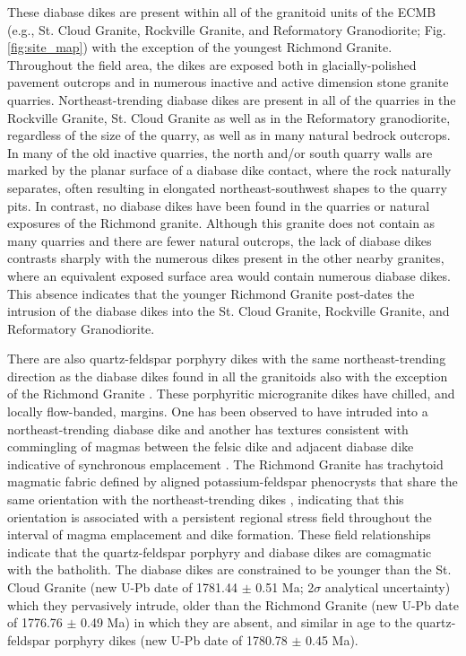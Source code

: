 \documentclass[draft]{agujournal2019}
\begin{document}
These diabase dikes are present within all of the granitoid units of the ECMB (e.g., St. Cloud Granite, Rockville Granite, and Reformatory Granodiorite; Fig. \ref{fig:site_map}) with the exception of the youngest Richmond Granite. Throughout the field area, the dikes are exposed both in glacially-polished pavement outcrops and in numerous inactive and active dimension stone granite quarries. Northeast-trending diabase dikes are present in all of the quarries in the Rockville Granite, St. Cloud Granite as well as in the Reformatory granodiorite, regardless of the size of the quarry, as well as in many natural bedrock outcrops. In many of the old inactive quarries, the north and/or south quarry walls are marked by the planar surface of a diabase dike contact, where the rock naturally separates, often resulting in elongated northeast-southwest shapes to the quarry pits. In contrast, no diabase dikes have been found in the quarries or natural exposures of the Richmond granite. Although this granite does not contain as many quarries and there are fewer natural outcrops, the lack of diabase dikes contrasts sharply with the numerous dikes present in the other nearby granites, where an equivalent exposed surface area would contain numerous diabase dikes. This absence indicates that the younger Richmond Granite post-dates the intrusion of the diabase dikes into the St. Cloud Granite, Rockville Granite, and Reformatory Granodiorite.

There are also quartz-feldspar porphyry dikes with the same northeast-trending direction as the diabase dikes found in all the granitoids also with the exception of the Richmond Granite \cite{Boerboom2005b}. These porphyritic microgranite dikes have chilled, and locally flow-banded, margins. One has been observed to have intruded into a northeast-trending diabase dike and another has textures consistent with commingling of magmas between the felsic dike and adjacent diabase dike indicative of synchronous emplacement \cite{Boerboom2000a}. The Richmond Granite has trachytoid magmatic fabric defined by aligned potassium-feldspar phenocrysts that share the same orientation with the northeast-trending dikes \cite{Boerboom2000a}, indicating that this orientation is associated with a persistent regional stress field throughout the interval of magma emplacement and dike formation. These field relationships indicate that the quartz-feldspar porphyry and diabase dikes are comagmatic with the batholith. The diabase dikes are constrained to be younger than the St. Cloud Granite (new U-Pb date of 1781.44 $\pm$ 0.51 Ma; 2$\sigma$ analytical uncertainty) which they pervasively intrude, older than the Richmond Granite (new U-Pb date of 1776.76 $\pm$ 0.49 Ma) in which they are absent, and similar in age to the quartz-feldspar porphyry dikes (new U-Pb date of 1780.78 $\pm$ 0.45 Ma).
\end{document}
